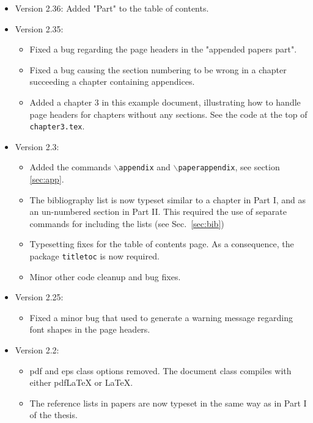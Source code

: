 \begin{itemize}
\begin{itemize}
		\end{itemize}
	 \item Version 2.36: Added "Part" to the table of contents.
    \item Version 2.35:
        \begin{itemize}
				\item Fixed a bug regarding the page headers in the "appended papers part".
				\item Fixed a bug causing the section numbering to be wrong in a chapter succeeding a chapter containing appendices.
			   \item Added a chapter 3 in this example document, illustrating how to handle page headers for chapters without any sections. See the code at the top of \texttt{chapter3.tex}.
		  \end{itemize}
    \item Version 2.3:
        \begin{itemize}
            \item Added the commands \texttt{$\backslash$appendix}
            and \texttt{$\backslash$paperappendix}, see section
            \ref{sec:app}.
            \item The bibliography list is now typeset similar to a
            chapter in Part I, and as an un-numbered section in Part
            II. This required the use of separate commands for
            including the lists (see Sec.~\ref{sec:bib})
            \item Typesetting fixes for the table of contents page.
            As a consequence, the package \texttt{titletoc} is now
            required.
            \item Minor other code cleanup and bug fixes.
        \end{itemize}
    \item Version 2.25:
    \begin{itemize}
        \item Fixed a minor bug that used to generate a warning
        message regarding font shapes in the page headers.
    \end{itemize}
    \item Version 2.2:
    \begin{itemize}
        \item pdf and eps class options removed. The document class
        compiles with either pdfLaTeX or \LaTeX.
        \item The reference lists in papers are now typeset in the
        same way as in Part I of the thesis.

\end{itemize}
\end{itemize}
